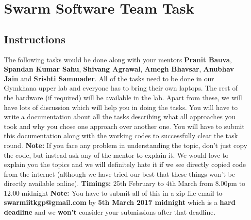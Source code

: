 \documentclass{article}
\begin{document}
\section*{Swarm Software Team Task}

\subsection*{Instructions} %
The following tasks would be done along with your mentors {\bf Pranit Bauva}, {\bf Spandan Kumar Sahu}, {\bf Shivang Agrawal}, {\bf Amegh Bhavsar}, {\bf Anubhav Jain} and {\bf Srishti Sammader}. All of the tasks need to be done in our Gymkhana upper lab and everyone has to bring their own laptops. The rest of the hardware (if required) will be available in the lab. Apart from these, we will have lots of discussion which will help you in doing the tasks. You will have to write a documentation about all the tasks describing what all approaches you took and why you chose one approach over another one. You will have to submit this documentation along with the working codes to successfully clear the task round. {\newline}{\newline}
{\bf Note:} If you face any problem in understanding the topic, don't just copy the code, but instead ask any of the mentor to explain it. We would love to explain you the topics and we will definitely hate it if we see directly copied code from the internet (although we have tried our best that these things won't be directly available online).
{\newline}{\newline}
{\bf Timings:} 25th February to 4th March from 8.00pm to 12.00 midnight
{\newline}{\newline}
{\bf Note:} You have to submit all of this in a zip file email to {\newline}{\bf  swarmiitkgp@gmail.com} by {\bf 5th March 2017 midnight} which is a {\bf hard deadline} and we {\bf won't} consider your submissions after that deadline.
\end{document}
